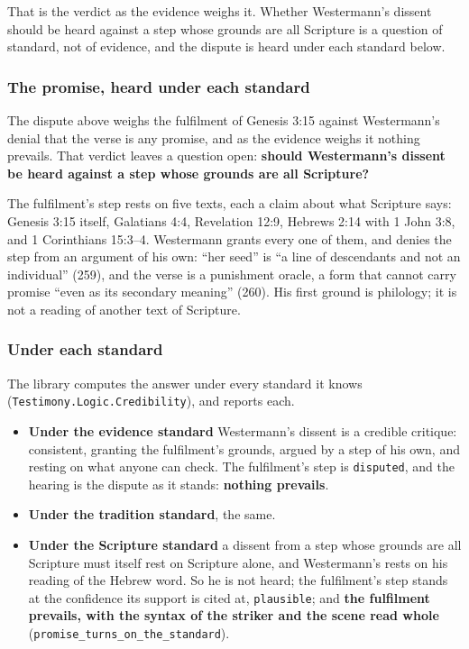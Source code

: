 \documentclass[11pt]{article}
\begin{document}
That is the verdict as the evidence weighs it. Whether Westermann’s dissent should be heard against a step whose grounds are all Scripture is a question of standard, not of evidence, and the dispute is heard under each standard below.

\subsubsection*{The promise, heard under each standard}
The dispute above weighs the fulfilment of Genesis 3:15 against Westermann’s denial that the verse is any promise, and as the evidence weighs it nothing prevails. That verdict leaves a question open: \textbf{should Westermann’s dissent be heard against a step whose grounds are all Scripture?}

The fulfilment’s step rests on five texts, each a claim about what Scripture says: Genesis 3:15 itself, Galatians 4:4, Revelation 12:9, Hebrews 2:14 with 1 John 3:8, and 1 Corinthians 15:3–4. Westermann grants every one of them, and denies the step from an argument of his own: “her seed” is “a line of descendants and not an individual” (259), and the verse is a punishment oracle, a form that cannot carry promise “even as its secondary meaning” (260). His first ground is philology; it is not a reading of another text of Scripture.

\subsubsection*{Under each standard}
The library computes the answer under every standard it knows (\texttt{Testimony.Logic.Credibility}), and reports each.

\begin{itemize}
  \item \textbf{Under the evidence standard} Westermann’s dissent is a credible critique: consistent, granting the fulfilment’s grounds, argued by a step of his own, and resting on what anyone can check. The fulfilment’s step is \texttt{disputed}, and the hearing is the dispute as it stands: \textbf{nothing prevails}.
  \item \textbf{Under the tradition standard}, the same.
  \item \textbf{Under the Scripture standard} a dissent from a step whose grounds are all Scripture must itself rest on Scripture alone, and Westermann’s rests on his reading of the Hebrew word. So he is not heard; the fulfilment’s step stands at the confidence its support is cited at, \texttt{plausible}; and \textbf{the fulfilment prevails, with the syntax of the striker and the scene read whole} (\texttt{promise\_\allowbreak{}turns\_\allowbreak{}on\_\allowbreak{}the\_\allowbreak{}standard}).
\end{itemize}
\end{document}
